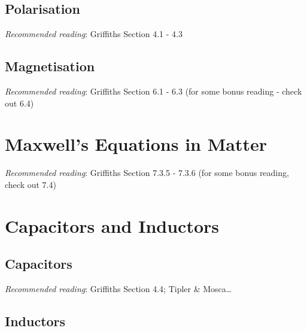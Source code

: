 \documentclass[
  letterpaper,
  DIV=11,
  numbers=noendperiod]{scrreprt}
\begin{document}
\section{Polarisation}\label{polarisation}

\emph{Recommended reading}: Griffiths Section 4.1 - 4.3

\section{Magnetisation}\label{magnetisation}

\emph{Recommended reading}: Griffiths Section 6.1 - 6.3 (for some bonus
reading - check out 6.4)


\chapter{Maxwell's Equations in
Matter}\label{maxwells-equations-in-matter}

\newcommand{\l}{\mathrm{\mathbf{l}}}
\newcommand{\E}{\mathrm{\mathbf{E}}}
\newcommand{\F}{\mathrm{\mathbf{F}}}
\newcommand{\r}{\mathrm{\mathbf{r}}}

\newcommand{\x}{\mathrm{\mathbf{x}}}
\newcommand{\y}{\mathrm{\mathbf{y}}}
\newcommand{\z}{\mathrm{\mathbf{z}}}

\emph{Recommended reading}: Griffiths Section 7.3.5 - 7.3.6 (for some
bonus reading, check out 7.4)


\chapter{Capacitors and Inductors}\label{capacitors-and-inductors}

\newcommand{\l}{\mathrm{\mathbf{l}}}
\newcommand{\E}{\mathrm{\mathbf{E}}}
\newcommand{\F}{\mathrm{\mathbf{F}}}
\newcommand{\r}{\mathrm{\mathbf{r}}}

\newcommand{\x}{\mathrm{\mathbf{x}}}
\newcommand{\y}{\mathrm{\mathbf{y}}}
\newcommand{\z}{\mathrm{\mathbf{z}}}

\section{Capacitors}\label{capacitors}

\emph{Recommended reading}: Griffiths Section 4.4; Tipler \&
Mosca\ldots{}

\section{Inductors}\label{inductors}
\end{document}
